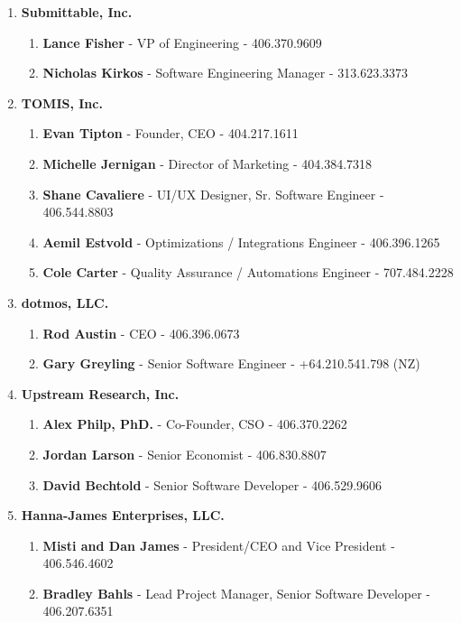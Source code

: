 \documentclass[oneside]{article}%
\begin{document}
\begin{enumerate}[]
	\item \large \textbf{Submittable, Inc.} \small
		\begin{enumerate}[]
			\item \textbf{Lance Fisher} - VP of Engineering - 406.370.9609
			\item \textbf{Nicholas Kirkos} - Software Engineering Manager - 313.623.3373
		\end{enumerate}
	\item \large \textbf{TOMIS, Inc.} \small
		\begin{enumerate}[]
			\item \textbf{Evan Tipton} - Founder, CEO - 404.217.1611
			\item \textbf{Michelle Jernigan} - Director of Marketing - 404.384.7318
			\item \textbf{Shane Cavaliere} - UI/UX Designer, Sr. Software Engineer - 406.544.8803
			\item \textbf{Aemil Estvold} - Optimizations / Integrations Engineer - 406.396.1265
			\item \textbf{Cole Carter} - Quality Assurance / Automations Engineer - 707.484.2228
		\end{enumerate}
	\item \large \textbf{dotmos, LLC.} \small
		\begin{enumerate}[]
			\item \textbf{Rod Austin} - CEO - 406.396.0673
			\item \textbf{Gary Greyling} - Senior Software Engineer - +64.210.541.798 (NZ)
		\end{enumerate}
	\item \large \textbf{Upstream Research, Inc.} \small
		\begin{enumerate}[]
			\item \textbf{Alex Philp, PhD.} - Co-Founder, CSO - 406.370.2262
			\item \textbf{Jordan Larson} - Senior Economist - 406.830.8807
			\item \textbf{David Bechtold} - Senior Software Developer - 406.529.9606
		\end{enumerate}
	\item \large \textbf{Hanna-James Enterprises, LLC.} \small
		\begin{enumerate}[]
			\item \textbf{Misti and Dan James} - President/CEO and Vice President - 406.546.4602
			\item \textbf{Bradley Bahls} - Lead Project Manager, Senior Software Developer - 406.207.6351

\end{enumerate}
\end{enumerate}
\end{document}

